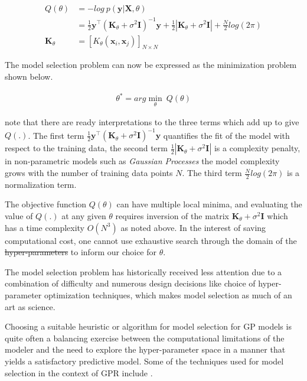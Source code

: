 \documentclass{article}
\providecommand{\DIFadd}[1]{{\protect\color{blue}\uwave{#1}}} %
\providecommand{\DIFdel}[1]{{\protect\color{red}\sout{#1}}}                      %
\providecommand{\DIFaddbegin}{} %
\providecommand{\DIFaddend}{} %
\providecommand{\DIFdelbegin}{} %
\providecommand{\DIFdelend}{} %
\newcommand{\DIFscaledelfig}{0.5}
\newlength{\DIFdelgraphicswidth} %
\newlength{\DIFdelgraphicsheight} %
\newcommand{\DIFaddincludegraphics}[2][]{{\color{blue}\fbox{\DIFOincludegraphics[#1]{#2}}}} %
\newcommand{\DIFdelincludegraphics}[2][]{%
\sbox{\DIFdelgraphicsbox}{\DIFOincludegraphics[#1]{#2}}%
\settoboxwidth{\DIFdelgraphicswidth}{\DIFdelgraphicsbox} %
\settoboxtotalheight{\DIFdelgraphicsheight}{\DIFdelgraphicsbox} %
\scalebox{\DIFscaledelfig}{%
\parbox[b]{\DIFdelgraphicswidth}{\usebox{\DIFdelgraphicsbox}\\[-\baselineskip] \rule{\DIFdelgraphicswidth}{0em}}\llap{\resizebox{\DIFdelgraphicswidth}{\DIFdelgraphicsheight}{%
\setlength{\unitlength}{\DIFdelgraphicswidth}%
\begin{picture}(1,1)%
\thicklines\linethickness{2pt} %
{\color[rgb]{1,0,0}\put(0,0){\framebox(1,1){}}}%
{\color[rgb]{1,0,0}\put(0,0){\line( 1,1){1}}}%
{\color[rgb]{1,0,0}\put(0,1){\line(1,-1){1}}}%
\end{picture}%
}\hspace*{3pt}}} %
} %
\DeclareRobustCommand{\DIFaddbegin}{\DIFOaddbegin \let\includegraphics\DIFaddincludegraphics} %
\DeclareRobustCommand{\DIFaddend}{\DIFOaddend \let\includegraphics\DIFOincludegraphics} %
\DeclareRobustCommand{\DIFdelbegin}{\DIFOdelbegin \let\includegraphics\DIFdelincludegraphics} %
\DeclareRobustCommand{\DIFdelend}{\DIFOaddend \let\includegraphics\DIFOincludegraphics} %
\begin{document}
\begin{align*}
  Q(\theta) & = - log \ p(\mathbf{y}|\mathbf{X}, \theta) \\
            & = \frac{1}{2} \mathbf{y}^\intercal (\mathbf{K}_\theta + \sigma^{2} \mathbf{I})^{-1} \mathbf{y} + \frac{1}{2}|\mathbf{K}_\theta + \sigma^{2} \mathbf{I}| + \frac{N}{2}log(2\pi) \\
  \mathbf{K}_\theta & = [K_{\theta}(\mathbf{x}_i, \mathbf{x}_j)]_{N \times N}
\end{align*}

The model selection problem can now be expressed as the minimization problem shown below.

\begin{align*}
\theta^* = arg\min_{\theta} \ Q(\theta)
\end{align*}

\citet{Rasmussen:2005:GPM:1162254} note that there are ready interpretations to the three terms which add up to give $Q(.)$. The first term $\frac{1}{2} \mathbf{y}^\intercal (\mathbf{K}_\theta + \sigma^{2} \mathbf{I})^{-1} \mathbf{y}$ quantifies the fit of the model with respect to the training data, the second term $\frac{1}{2}|\mathbf{K}_\theta + \sigma^{2} \mathbf{I}|$ is a complexity penalty, in non-parametric models such as \emph{Gaussian Processes} the model complexity grows with the number of training data points $N$. The third term $\frac{N}{2}log(2\pi)$ is a normalization term.

The objective function $Q(\theta)$ can have multiple local minima, and evaluating the value of $Q(.)$ at any given $\theta$ requires inversion of the matrix $\mathbf{K}_\theta + \sigma^{2} \mathbf{I}$ which has a time complexity $O(N^3)$ as noted above. In the interest of saving computational cost, one cannot use exhaustive search through the domain of the \DIFdelbegin \DIFdel{hyper-parameters }\DIFdelend \DIFaddbegin \DIFadd{hyperparameters }\DIFaddend to inform our choice for $\theta$.

The model selection problem has historically received less attention
due to a combination of difficulty and numerous design decisions like
choice of hyper-parameter optimization techniques, which makes model
selection as much of an art as science. 
\DIFaddbegin 

\DIFaddend Choosing a suitable heuristic or algorithm for model selection for GP
models is quite often a balancing exercise between the computational
limitations of the modeler and the need to explore the hyper-parameter
space in a manner that yields a satisfactory predictive model. Some of
the techniques used for model selection in the context of GPR include
\DIFaddbegin \DIFadd{the following}\DIFaddend .
\end{document}
